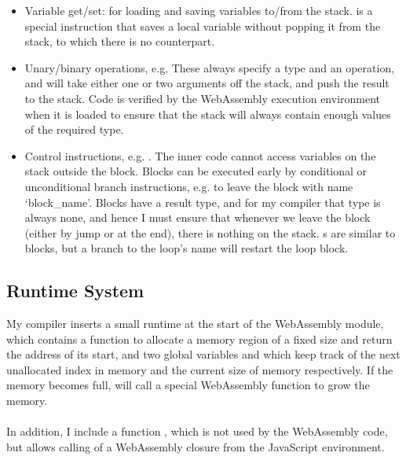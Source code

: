 \begin{itemize}
\item Variable get/set:  for loading and saving variables to/from the stack.  is a special instruction that saves a local variable without popping it from the stack, to which there is no  counterpart.
\item Unary/binary operations, e.g.  These always specify a type and an operation, and will take either one or two arguments off the stack, and push the result to the stack. Code is verified by the WebAssembly execution environment when it is loaded to ensure that the stack will always contain enough values of the required type.
\item Control instructions, e.g. . The inner code cannot access variables on the stack outside the block. Blocks can be executed early by conditional or unconditional branch instructions, e.g.  to leave the block with name `block\_name'. Blocks have a result type, and for my compiler that type is always none, and hence I must ensure that whenever we leave the block (either by jump or at the end), there is nothing on the stack. s are similar to blocks, but a branch to the loop's name will restart the loop block.
\end{itemize}

\subsection{Runtime System}
My compiler inserts a small runtime at the start of the WebAssembly module, which contains a function  to allocate a memory region of a fixed size and return the address of its start, and two global variables  and  which keep track of the next unallocated index in memory and the current size of memory respectively. If the memory becomes full,  will call a special WebAssembly function to grow the memory.
\\\\
In addition, I include a function , which is not used by the WebAssembly code, but allows calling of a WebAssembly closure from the JavaScript environment.

